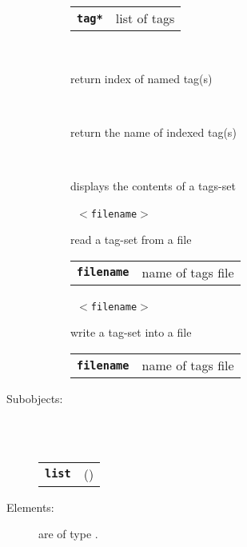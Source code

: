 \begin{description}
\begin{description}
      \begin{tabular}{ll}
 \texttt{\textbf{tag*}} & list of tags \\
      \end{tabular}
       \texttt{} \

        return index of named tag(s)

       \texttt{} \

        return the name of indexed tag(s)

       \texttt{} \

        displays the contents of a tags-set

       \texttt{ $<$filename$>$} \

        read a tag-set from a file

      \begin{tabular}{ll}
 \texttt{\textbf{filename}} &  name of tags file  \\
      \end{tabular}
       \texttt{ $<$filename$>$} \

        write a tag-set into a file

      \begin{tabular}{ll}
 \texttt{\textbf{filename}} &  name of tags file  \\
      \end{tabular}
    \end{description}

  \item[Subobjects:] \hfill \\
\ 
    \begin{tabular}{ll}
      \texttt{\textbf{list}} & (\Jref{module}{List}) \\
    \end{tabular}
\vspace{3mm}

  \item[Elements:] are of type .


\end{description}

